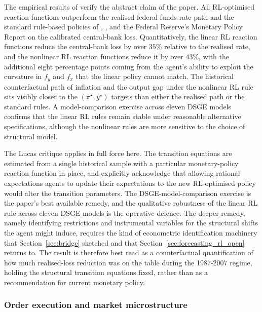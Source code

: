 The empirical results of \citet{HinterlangTaenzer2024} verify the abstract
claim of the paper. All RL-optimised reaction functions outperform the
realised federal funds rate path and the standard rule-based policies of
\citet{Taylor1993}, \citet{TaylorWilliams2010}, and the Federal Reserve's
Monetary Policy Report on the calibrated central-bank loss. Quantitatively,
the linear RL reaction functions reduce the central-bank loss by over $35\%$
relative to the realised rate, and the nonlinear RL reaction functions reduce
it by over $43\%$, with the additional eight percentage points coming from
the agent's ability to exploit the curvature in $f_y$ and $f_\pi$ that the
linear policy cannot match. The historical counterfactual path of inflation
and the output gap under the nonlinear RL rule sits visibly closer to the
$(\pi^\star, y^\star)$ targets than either the realised path or the standard
rules. A model-comparison exercise across eleven DSGE models confirms that
the linear RL rules remain stable under reasonable alternative
specifications, although the nonlinear rules are more sensitive to the choice
of structural model.

The Lucas critique applies in full force here. The transition equations are
estimated from a single historical sample with a particular monetary-policy
reaction function in place, and \citet{HinterlangTaenzer2024} explicitly
acknowledge that allowing rational-expectations agents to update their
expectations to the new RL-optimised policy would alter the transition
parameters. The DSGE-model-comparison exercise is the paper's best available
remedy, and the qualitative robustness of the linear RL rule across eleven
DSGE models is the operative defence. The deeper remedy, namely identifying
restrictions and instrumental variables for the structural shifts the agent
might induce, requires the kind of econometric identification machinery that
Section~\ref{sec:bridge} sketched and that
Section~\ref{sec:forecasting_rl_open} returns to. The
\citet{HinterlangTaenzer2024} result is therefore best read as a
counterfactual quantification of how much realised-loss reduction was on the
table during the 1987-2007 regime, holding the structural transition
equations fixed, rather than as a recommendation for current monetary
policy.

\subsubsection{Order execution and market microstructure}
\label{sec:app_execution}

